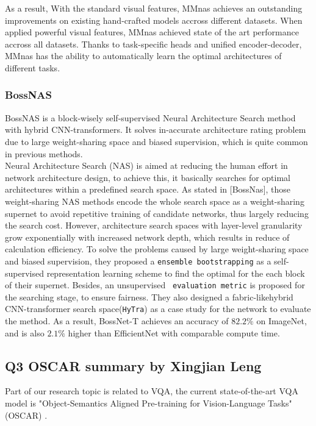\documentclass[12pt, a4paper]{article}
\begin{document}
\par\noindent \newline As a result, With the standard visual features, MMnas \cite{DBLP:journals/corr/abs-2004-12070} achieves an outstanding improvements on existing hand-crafted models accross different datasets. When applied powerful visual features, MMnas achieved state of the art performance accross all datasets. Thanks to task-specific heads and unified encoder-decoder, MMnas \cite{DBLP:journals/corr/abs-2004-12070} has the ability to automatically learn the optimal architectures of different tasks. 

\subsubsection*{BossNAS}
BossNAS is a block-wisely self-supervised Neural Architecture Search method with hybrid CNN-transformers. It solves in-accurate architecture rating problem due to large weight-sharing space and biased supervision, which is quite common in previous methods.\\ Neural Architecture Search (NAS) is aimed at reducing the human effort in network architecture design, to achieve this, it basically searches for optimal architectures within a predefined search space. As stated in [BossNas], those weight-sharing NAS methods encode the whole search space as a weight-sharing supernet to avoid repetitive training of candidate networks, thus largely reducing the search cost. However, architecture search spaces with layer-level granularity grow exponentially with increased network depth, which results in reduce of calculation efficiency. To solve the problems caused by large weight-sharing space and biased supervision, they proposed a \verb|ensemble bootstrapping| as a self-supervised representation learning scheme to find the optimal for the each block of their supernet. Besides, an unsupervised \verb| evaluation metric| is proposed for the searching stage, to ensure fairness. They also designed a fabric-likehybrid CNN-transformer search space(\verb|HyTra|) as a case study for the network to evaluate the method. As a result, BossNet-T achieves an accuracy of $82.2\%$ on ImageNet, and is also $2.1\%$ higher than EfficientNet with comparable compute time.

\subsection*{Q3 OSCAR summary by Xingjian Leng}
\par\noindent \newline Part of our research topic is related to VQA, the current state-of-the-art VQA model is "Object-Semantics Aligned Pre-training for Vision-Language Tasks" (OSCAR) \cite{DBLP:journals/corr/abs-2004-06165}.
\end{document}
